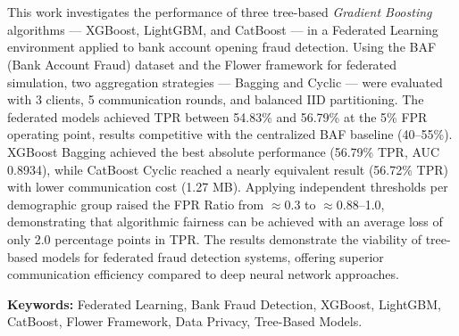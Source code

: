 \section*{}

This work investigates the performance of three tree-based \textit{Gradient Boosting} algorithms --- XGBoost, LightGBM, and CatBoost --- in a Federated Learning environment applied to bank account opening fraud detection. Using the BAF (Bank Account Fraud) dataset and the Flower framework for federated simulation, two aggregation strategies --- Bagging and Cyclic --- were evaluated with 3 clients, 5 communication rounds, and balanced IID partitioning. The federated models achieved TPR between 54.83\% and 56.79\% at the 5\% FPR operating point, results competitive with the centralized BAF baseline (40--55\%). XGBoost Bagging achieved the best absolute performance (56.79\% TPR, AUC 0.8934), while CatBoost Cyclic reached a nearly equivalent result (56.72\% TPR) with lower communication cost (1.27 MB). Applying independent thresholds per demographic group raised the FPR Ratio from $\approx$0.3 to $\approx$0.88--1.0, demonstrating that algorithmic fairness can be achieved with an average loss of only 2.0 percentage points in TPR. The results demonstrate the viability of tree-based models for federated fraud detection systems, offering superior communication efficiency compared to deep neural network approaches.

{\bf Keywords:} Federated Learning, Bank Fraud Detection, XGBoost, LightGBM, CatBoost, Flower Framework, Data Privacy, Tree-Based Models.
